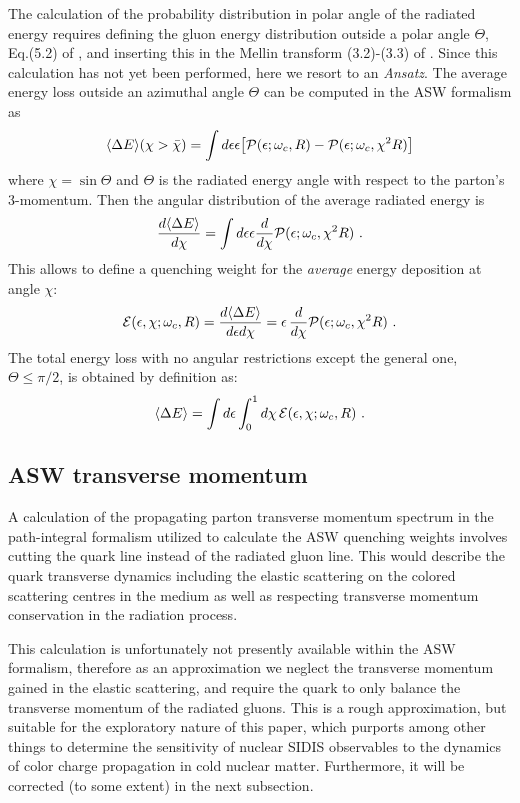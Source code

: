 The calculation of the probability distribution in polar angle of the radiated energy requires defining the gluon energy distribution outside a polar angle $\Theta$, Eq.(5.2) of \cite{Salgado:2003gb}, and inserting this in the Mellin transform (3.2)-(3.3) of \cite{Salgado:2003gb}. Since this calculation has not yet been performed, here we resort to an {\it Ansatz}. The average energy loss outside an azimuthal angle $\Theta$ can be computed in the ASW formalism as
\begin{align}
  \langle \Delta E \rangle(\chi > \bar\chi) = \int d\epsilon \epsilon 
    \big[ {\mathcal P}(\epsilon;\omega_c,R) - {\mathcal P}(\epsilon;\omega_c,\chi^2 R) \big] 
\end{align}
where $\chi = \sin \Theta$ and $\Theta$ is the radiated energy angle with 
respect to the parton's 3-momentum. Then the angular distribution of the 
average radiated energy is  
\begin{align}
  \frac{d\langle \Delta E \rangle}{d\chi} = \int d\epsilon \epsilon 
    \frac{d}{d\chi}{\mathcal P}(\epsilon;\omega_c,\chi^2 R) \ . 
\end{align}
This allows to define a quenching weight for the {\it average} energy 
deposition at angle $\chi$:
\begin{align}
  {\mathcal E}(\epsilon,\chi;\omega_c,R) = \frac{d\langle \Delta E \rangle}{d\epsilon d\chi} 
    = \epsilon\,\frac{d}{d\chi}{\mathcal P}(\epsilon;\omega_c,\chi^2 R) \ . 
\end{align}
The total energy loss with no angular restrictions except the general one, 
$\Theta\leq \pi/2$, is obtained by definition as:
\begin{align}
  \langle \Delta E \rangle = \int d\epsilon \int_0^1 d\chi\, 
    {\mathcal E}(\epsilon,\chi;\omega_c,R) \ .
\label{eq:integrated_ang_qw}
\end{align} 


\subsection{ASW transverse momentum}
\label{sec:angularASW}

A calculation of the propagating parton transverse momentum spectrum in the path-integral formalism utilized to calculate the ASW quenching weights involves cutting the quark line instead of the radiated gluon line. This would describe the quark transverse dynamics including the elastic scattering on the colored scattering centres in the medium as well as respecting transverse momentum conservation in the radiation process. 

This calculation is unfortunately not presently available within the ASW formalism, therefore as an approximation we neglect the transverse momentum gained in the elastic scattering, and require the quark to only balance the transverse momentum of the radiated gluons. This is a rough approximation, but suitable for the exploratory nature of this paper, which purports among other things to determine the sensitivity of nuclear SIDIS observables to the dynamics of color charge propagation in cold nuclear matter. Furthermore, it will be corrected (to some extent) in the next subsection.

